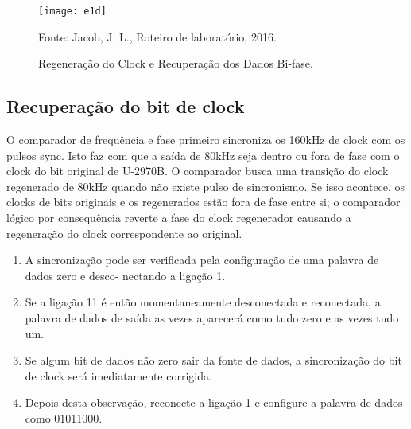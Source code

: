             \newpage
            \begin{figure}[H]
                \centering
                \caption{Regeneração do Clock e Recuperação dos Dados Bi-fase.}
                \texttt{[image: e1d]}
                
                \small Fonte: Jacob, J. L., Roteiro de laboratório, 2016.
                \label{fig:e1d}
            \end{figure}
            
        \subsection{Recuperação do bit de clock}
            O comparador de frequência e fase primeiro sincroniza os 160kHz de clock com os pulsos sync.
            Isto faz com que a saída de 80kHz seja dentro ou fora de fase com o clock do bit original de
            U-2970B. O comparador busca uma transição do clock regenerado de 80kHz quando não existe
            pulso de sincronismo. Se isso acontece, os clocks de bits originais e os regenerados estão fora de
            fase entre si; o comparador lógico por consequência reverte a fase do clock regenerador causando
            a regeneração do clock correspondente ao original.
            
            \begin{enumerate}
                \item A sincronização pode ser verificada pela configuração de uma palavra de dados zero e desco-
                nectando a ligação 1.
                \item Se a ligação 11 é então momentaneamente desconectada e reconectada, a palavra de dados
                de saída as vezes aparecerá como tudo zero e as vezes tudo um.
                \item Se algum bit de dados não zero sair da fonte de dados, a sincronização do bit de clock será
                imediatamente corrigida.
                \item Depois desta observação, reconecte a ligação 1 e configure a palavra de dados como 01011000.
            \end{enumerate}
            
            
